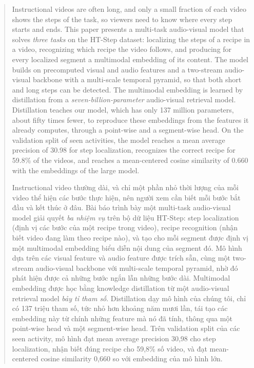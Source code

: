 \documentclass{IEEEtran}
\begin{document}
\begin{abstract}
Instructional videos are often long, and only a small fraction of each video shows the steps of the task, so viewers need to know where every step starts and ends. This paper presents a multi-task audio-visual model that solves \emph{three tasks} on the HT-Step dataset: localizing the steps of a recipe in a video, recognizing which recipe the video follows, and producing for every localized segment a multimodal embedding of its content. The model builds on precomputed visual and audio features and a two-stream audio-visual backbone with a multi-scale temporal pyramid, so that both short and long steps can be detected. The multimodal embedding is learned by distillation from a \emph{seven-billion-parameter} audio-visual retrieval model. Distillation teaches our model, which has only 137 million parameters, about fifty times fewer, to reproduce these embeddings from the features it already computes, through a point-wise and a segment-wise head. On the validation split of seen activities, the model reaches a mean average precision of 30.98 for step localization, recognizes the correct recipe for 59.8\% of the videos, and reaches a mean-centered cosine similarity of 0.660 with the embeddings of the large model.

Instructional video thường dài, và chỉ một phần nhỏ thời lượng của mỗi video thể hiện các bước thực hiện, nên người xem cần biết mỗi bước bắt đầu và kết thúc ở đâu. Bài báo trình bày một multi-task audio-visual model giải quyết \emph{ba nhiệm vụ} trên bộ dữ liệu HT-Step: step localization (định vị các bước của một recipe trong video), recipe recognition (nhận biết video đang làm theo recipe nào), và tạo cho mỗi segment được định vị một multimodal embedding biểu diễn nội dung của segment đó. Mô hình dựa trên các visual feature và audio feature được trích sẵn, cùng một two-stream audio-visual backbone với multi-scale temporal pyramid, nhờ đó phát hiện được cả những bước ngắn lẫn những bước dài. Multimodal embedding được học bằng knowledge distillation từ một audio-visual retrieval model \emph{bảy tỉ tham số}. Distillation dạy mô hình của chúng tôi, chỉ có 137 triệu tham số, tức nhỏ hơn khoảng năm mươi lần, tái tạo các embedding này từ chính những feature mà nó đã tính, thông qua một point-wise head và một segment-wise head. Trên validation split của các seen activity, mô hình đạt mean average precision 30,98 cho step localization, nhận biết đúng recipe cho 59,8\% số video, và đạt mean-centered cosine similarity 0,660 so với embedding của mô hình lớn.
\end{abstract}
\end{document}
